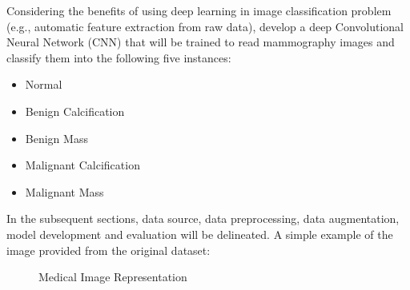 \documentclass{book}
\begin{document}
        Considering the benefits of using deep learning in image classification problem (e.g., automatic feature extraction from raw data), develop a deep Convolutional Neural Network (CNN) that will be trained to read mammography images and classify them into the following five instances:

        \begin{itemize}
            \item Normal
            \item Benign Calcification
            \item Benign Mass
            \item Malignant Calcification
            \item Malignant Mass
        \end{itemize}

        In the subsequent sections, data source, data preprocessing, data augmentation, model development and evaluation will be delineated. A simple example of the image provided from the original dataset:

        \begin{figure}[h]
            \hfill
            \hfill
            \hfill
            \hfill
            \caption{Medical Image Representation}
        \end{figure}
         
\end{document}
